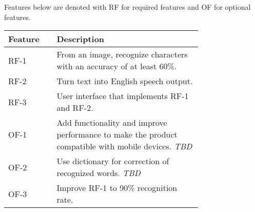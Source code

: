 \documentclass[../main.tex]{subfiles}
\begin{document}
Features below are denoted with RF for required features and OF for optional
features.
  \noindent\begin{tabularx}{\linewidth}{X p{0.75\linewidth}}
  \toprule
    \textbf{Feature} & \textbf{Description} \\
  \midrule
  RF-1 &
    From an image, recognize characters with an accuracy of at least 60\%. \\
  RF-2 &
    Turn text into English speech output. \\
  RF-3 &
    User interface that implements RF-1 and RF-2. \\
  OF-1 &
    Add functionality and improve performance to make the product compatible
    with mobile devices. \textit{TBD} \\
  OF-2 &
    Use dictionary for correction of recognized words. \textit{TBD} \\
  OF-3 &
    Improve RF-1 to 90\% recognition rate. \\
  \bottomrule
  \end{tabularx}
\end{document}

